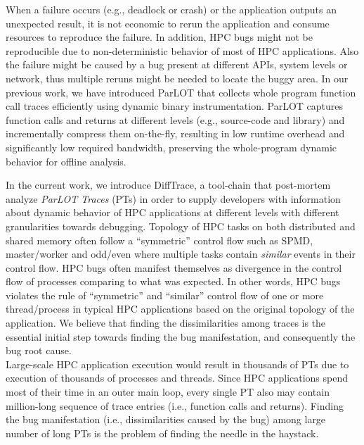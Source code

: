 When a failure occurs (e.g., deadlock or crash) or the application outputs an unexpected result, it is not economic to rerun the application and consume resources to reproduce the failure. In addition, HPC bugs might not be reproducible due to non-deterministic behavior of most of HPC applications. Also the failure might be caused by a bug present at different APIs, system levels or network, thus multiple reruns might be needed to locate the buggy area.
In our previous work\cite{parlot}, we have introduced ParLOT that collects whole program function call traces efficiently using dynamic binary instrumentation.
%
ParLOT captures function calls and returns at different levels (e.g., source-code and library) and incrementally compress them on-the-fly, resulting in low runtime overhead and significantly low required bandwidth, preserving the whole-program dynamic behavior for offline analysis.
%


In the current work, we introduce DiffTrace, a tool-chain that post-mortem analyze \textit{ParLOT Traces} (PTs)  in order to supply developers with information about dynamic behavior of HPC applications at different levels with different granularities towards debugging. 
%
Topology of HPC tasks on both distributed and shared memory often follow a ``symmetric'' control flow such as SPMD, master/worker and odd/even where multiple tasks contain \textit{similar} events in their control flow. 
%
HPC bugs often manifest themselves as divergence in the control flow of processes comparing to what was expected.
%
In other words, HPC bugs violates the rule of ``symmetric'' and ``similar'' control flow of one or more thread/process in typical HPC applications based on the original topology of the application.
%
We believe that finding the dissimilarities among traces is the essential initial step towards finding the bug manifestation, and consequently the bug root cause.
% 
\\
Large-scale HPC application execution would result in thousands of PTs due to execution of thousands of processes and threads.
%
Since HPC applications spend most of their time in an outer main loop, every single PT also may contain million-long sequence of trace entries (i.e., function calls and returns).
%
Finding the bug manifestation (i.e., dissimilarities caused by the bug) among large number of long PTs is the problem of finding the needle in the haystack.

